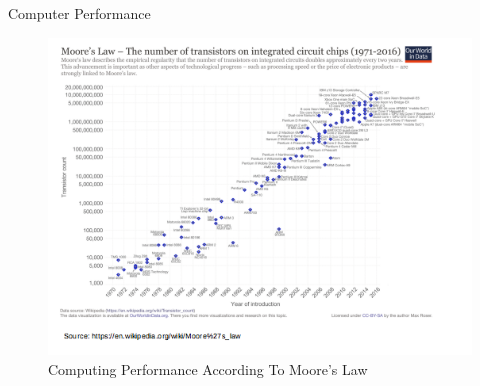 \documentclass[ignorenonframetext,]{beamer}
\begin{document}
\begin{frame}{Computer Performance}
\protect\hypertarget{computer-performance}{}

\begin{figure}
\centering
\includegraphics{odg/moorelaw.png}
\caption{Computing Performance According To Moore's Law}
\end{figure}


\end{frame}
\end{document}
